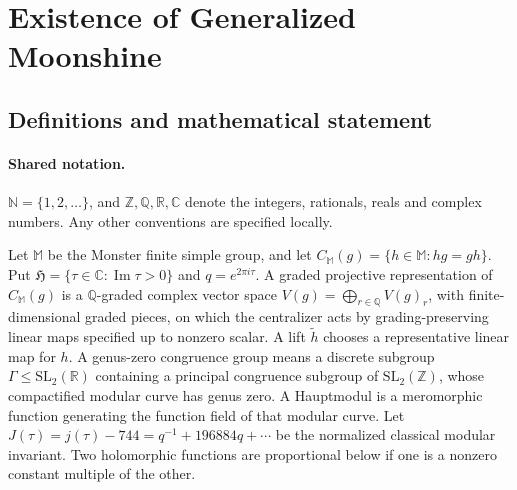 \documentclass[11pt]{article}
\begin{document}
\section{Existence of Generalized Moonshine}\label{statement}

\subsection{Definitions and mathematical statement}

\paragraph{Shared notation.}$\mathbb N=\{1,2,\ldots\}$, and $\mathbb Z,\mathbb Q,\mathbb R,\mathbb C$ denote the integers, rationals, reals and complex numbers. Any other conventions are specified locally.


Let \(\mathbb M\) be the Monster finite simple group, and let
\(C_{\mathbb M}(g)=\{h\in\mathbb M:hg=gh\}\).
Put \(\mathfrak H=\{\tau\in\mathbb C:\operatorname{Im}\tau>0\}\) and
\(q=e^{2\pi i\tau}\).
A graded projective representation of \(C_{\mathbb M}(g)\) is a
\(\mathbb Q\)-graded complex vector space
\(V(g)=\bigoplus_{r\in\mathbb Q}V(g)_r\), with finite-dimensional graded
pieces, on which the centralizer acts by grading-preserving linear
maps specified up to nonzero scalar.
A lift \(\widetilde h\) chooses a representative linear map for \(h\).
A genus-zero congruence group means a discrete subgroup
\(\Gamma\le\mathrm{SL}_2(\mathbb R)\) containing a principal congruence
subgroup of \(\mathrm{SL}_2(\mathbb Z)\), whose compactified modular
curve has genus zero.  A Hauptmodul is a meromorphic function
generating the function field of that modular curve.
Let \(J(\tau)=j(\tau)-744=q^{-1}+196884q+\cdots\) be the normalized
classical modular invariant.
Two holomorphic functions are proportional below if one is a
nonzero constant multiple of the other.
\end{document}
